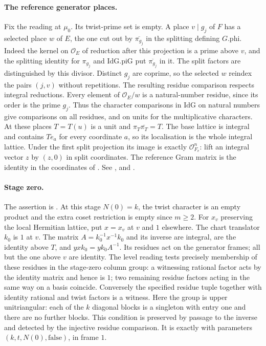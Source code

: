 \paragraph{The reference generator places.}
Fix the reading at $\mu_0$. Its twist-prime set is empty. A place $v\mid g_j$
of $F$ has a selected place $w$ of $E$, the one cut out by
$\overline{\pi_{g_j}}$ in the splitting defining $G.\mathrm{phi}$.
Indeed the kernel on $\mathcal O_E$ of reduction after this projection
is a prime above $v$, and the splitting identity for $\pi_{g_j}$ and
$\mathrm{IdG}.\mathrm{piG}$ put $\overline{\pi_{g_j}}$ in it.
The split factors are distinguished by this divisor. Distinct $g_j$ are
coprime, so the selected $w$ reindex the pairs $(j,v)$ without repetitions.
The resulting residue comparison respects integral reductions. Every element
of $\mathcal O_E/w$ is a natural-number residue, since its order is the
prime $g_j$. Thus the character comparisons in $\mathrm{IdG}$ on natural
numbers give comparisons on all residues, and on units for the multiplicative
characters. At these places $T=T(u)$ is a unit and
$\pi_T\overline{\pi_T}=T$. The base lattice is integral and contains
$Te_a$ for every coordinate $a$, so its localisation is the whole
integral lattice. Under the first split projection its image is exactly
$\mathcal O_{F_v}^n$: lift an integral vector $z$ by $(z,0)$ in split
coordinates. The reference Gram matrix is the identity in the coordinates
of .
See ,
 and .

\paragraph{Stage zero.}
The assertion is .
At this stage $N(0)=k$, the twist character is an empty product and the
extra coset restriction is empty since $m\ge2$. For $x_v$ preserving
the local Hermitian lattice, put $x=x_v$ at $v$ and $1$ elsewhere.
The chart translator $k_0$ is $1$ at $v$. The matrix
$A=k_0^{-1}x^{-1}k_0$ and its inverse are integral, are the identity
above $T$, and $y x k_0=y k_0 A^{-1}$. Its residues act on the generator
frames; all but the one above $v$ are identity. The level reading tests
precisely membership of these residues in the stage-zero column group:
a witnessing rational factor acts by the identity matrix and hence is $1$;
two remaining residue factors acting in the same way on a basis coincide.
Conversely the specified residue tuple together with identity rational and
twist factors is a witness. Here the group is upper unitriangular:
each of the $k$ diagonal blocks is a singleton with entry one and there
are no further blocks. This condition is preserved by passage to the
inverse and detected by the injective residue comparison. It is exactly
 with parameters $(k,t,N(0),\mathrm{false})$, in frame $1$.

